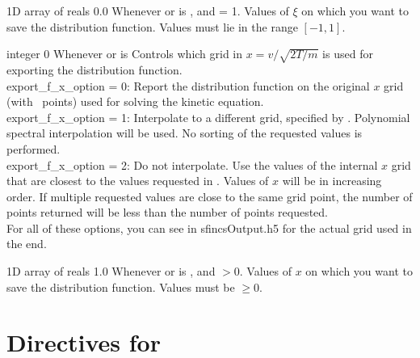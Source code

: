 \myhrule

{1D array of reals}
{0.0}
{Whenever  or  is \true, and  = 1.}
{Values of $\xi$ on which you want to save the distribution function.  Values must lie in the range $[-1,1]$.}

\myhrule

{integer}
{0}
{Whenever  or  is \true}
{Controls which grid in $x = v/\sqrt{2T/m}$ is used for exporting the distribution function.\\

{\ttfamily export\_f\_x\_option} = 0: Report the distribution function on the original $x$ grid (with \Nx~points) used for solving the kinetic equation.\\

{\ttfamily export\_f\_x\_option} = 1: Interpolate to a different grid, specified by .  Polynomial spectral interpolation will be used.
  No sorting of the requested values is performed.\\

{\ttfamily export\_f\_x\_option} = 2: Do not interpolate. Use the values of the internal $x$ grid that are closest to the values requested in .
  Values of $x$ will be in increasing order. If multiple requested values are close to the same grid point, the number of
  points returned will be less than the number of points requested.\\

For all of these options, you can see  in {\ttfamily sfincsOutput.h5} for the actual grid used in the end.
}

\myhrule

{1D array of reals}
{1.0}
{Whenever  or  is \true, and  $>0$.}
{Values of $x$ on which you want to save the distribution function.  Values must be $\ge 0$.}




















\section{Directives for \sfincsScan}
\label{sec:sfincsScanParams}

